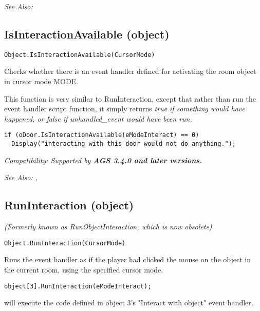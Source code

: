 \it{See Also:} 


\subsection{IsInteractionAvailable (object)}\label{Object.IsInteractionAvailable}%

\begin{verbatim}
Object.IsInteractionAvailable(CursorMode)
\end{verbatim}
Checks whether there is an event handler defined for activating the room object
in cursor mode MODE.

This function is very similar to RunInteraction, except that rather than run the event
handler script function, it simply returns \it{true} if something would have happened,
or \it{false} if unhandled_event would have been run.

\begin{verbatim}
if (oDoor.IsInteractionAvailable(eModeInteract) == 0)
  Display("interacting with this door would not do anything.");
\end{verbatim}

\it{Compatibility:} Supported by \bf{AGS 3.4.0} and later versions.

\it{See Also:} ,


\subsection{RunInteraction (object)}\label{Object.RunInteraction}%

\it{(Formerly known as RunObjectInteraction, which is now obsolete)}

\begin{verbatim}
Object.RunInteraction(CursorMode)
\end{verbatim}
Runs the event handler as if the player had clicked the mouse
on the object in the current room, using the specified cursor mode.

\begin{verbatim}
object[3].RunInteraction(eModeInteract);
\end{verbatim}
will execute the code defined in object 3's "Interact with object" event handler.

